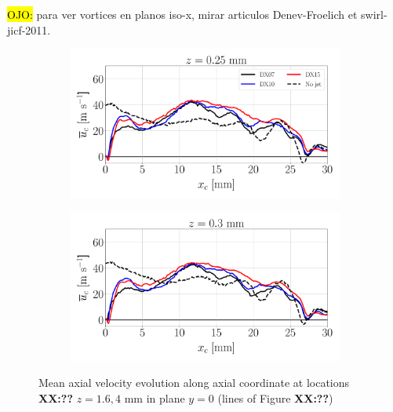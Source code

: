 \hl{OJO:} para ver vortices en planos iso-x, mirar articulos Denev-Froelich et swirl-jicf-2011.

\begin{figure}[ht]
\flushleft
\begin{subfigure}[b]{0.45\textwidth}
	\centering
   \includegraphics[scale=0.22]{./part3_applications/figures_ch8_resolved/turbulent_structures/line_y0_along_x_zlow}
\end{subfigure}
\hspace{0.4in}
\begin{subfigure}[b]{0.45\textwidth}
	\centering
   \includegraphics[scale=0.22]{./part3_applications/figures_ch8_resolved/turbulent_structures/line_y0_along_x_zhigh}
\end{subfigure}
\caption{Mean axial velocity evolution along axial coordinate at locations \textbf{XX:??} $z = 1.6, 4$ mm in plane $y = 0$ (lines of Figure \textbf{XX:??})}
\label{fig:BIMER_sps_lines_y0_along_x_ux_mean}
\end{figure}


